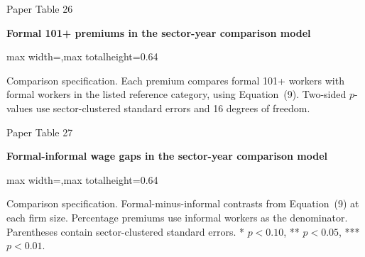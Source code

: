 \begin{frame}{Paper Table 26}
\begin{minipage}{\textwidth}\small\textbf{Formal 101+ premiums in the sector-year comparison model}\end{minipage}\par\vspace{0.15cm}
\centering\begingroup\fontsize{8.5}{10}\selectfont
\setlength{\tabcolsep}{4pt}\renewcommand{\arraystretch}{1.06}
\begin{adjustbox}{max width=\textwidth,max totalheight=0.64\textheight}

\end{adjustbox}\endgroup\par\vspace{0.10cm}
{\fontsize{6.5}{7.5}\selectfont\raggedright Comparison specification. Each premium compares formal 101+ workers with formal workers in the listed reference category, using Equation~(9). Two-sided $p$-values use sector-clustered standard errors and 16 degrees of freedom.\par}
\end{frame}

\begin{frame}{Paper Table 27}
\begin{minipage}{\textwidth}\small\textbf{Formal-informal wage gaps in the sector-year comparison model}\end{minipage}\par\vspace{0.15cm}
\centering\begingroup\fontsize{8.5}{10}\selectfont
\setlength{\tabcolsep}{4pt}\renewcommand{\arraystretch}{1.06}
\begin{adjustbox}{max width=\textwidth,max totalheight=0.64\textheight}

\end{adjustbox}\endgroup\par\vspace{0.10cm}
{\fontsize{6.5}{7.5}\selectfont\raggedright Comparison specification. Formal-minus-informal contrasts from Equation~(9) at each firm size. Percentage premiums use informal workers as the denominator. Parentheses contain sector-clustered standard errors. * $p<0.10$, ** $p<0.05$, *** $p<0.01$.\par}
\end{frame}

